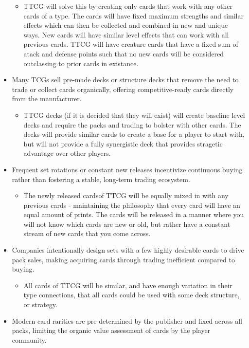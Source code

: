 \begin{itemize}
\begin{itemize}
		\item TTCG will solve this by creating only cards that work with any other cards of a type. The cards will have fixed maximum strengths and similar effects which can then be collected and combined in new and unique ways. New cards will have similar level effects that can work with all previous cards. TTCG will have creature cards that have a fixed sum of atack and defense points such that no new cards will be considered outclassing to prior cards in existance. 
  	\end{itemize}
	\item Many TCGs sell pre-made decks or structure decks that remove the need to trade or collect cards organically, offering competitive-ready cards directly from the manufacturer.
 	\begin{itemize}
		\item TTCG decks (if it is decided that they will exist) will create baseline level decks and require the packs and trading to bolster with other cards. The decks will provide similar cards to create a base for a player to start with, but will not provide a fully synergistic deck that provides stragetic advantage over other players. 
  	\end{itemize}
 	\item Frequent set rotations or constant new releases incentivize continuous buying rather than fostering a stable, long-term trading ecosystem.
 	\begin{itemize}
		\item The newly released cardsof TTCG will be equally mixed in with any previous cards - maintaining the philosophy that every card will have an equal amount of prints. The cards will be released in a manner where you will not know which cards are new or old, but rather have a constant stream of new cards that you come across.
  	\end{itemize}
  	\item Companies intentionally design sets with a few highly desirable cards to drive pack sales, making acquiring cards through trading inefficient compared to buying.
 	\begin{itemize}
		\item All cards of TTCG will be similar, and have enough variation in their type connections, that all cards could be used with some deck structure, or strategy.
  	\end{itemize}
   	\item Modern card rarities are pre-determined by the publisher and fixed across all packs, limiting the organic value assessment of cards by the player community.

\end{itemize}
